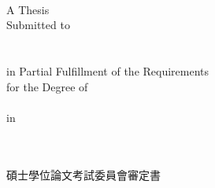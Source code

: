 \begin{center}
\fi
%
\renewcommand{\baselinestretch}{\mybaselinestretch}   %
\large %
%
\vfill
\makebox[4cm][s]{\large{\univCname}}\\%
\makebox[6cm][s]{\large{\deptCname}}\\%
\\%
%
\vfill
\large{A Thesis}\\%
\large{Submitted to }%
%
\large{\fulldeptEname}\\%
%
%
\ifx \collEname  \itsempty
\relax %
\else
\large{\collEname}\\%
\fi
%
\large{\univEname}\\%
%
\large{in Partial Fulfillment of the Requirements}\\
%
\large{for the Degree of}\\
%
\large{\degreeEname}\\%
%
\large{in}\\
%
\large{\deptEname}\\%
%
\large{\eMonth\ \eYear}\\%
%
\large{\ePlace}%
\vfill
{}
\end{center}
\normalsize
\clearpage
%
\newpage%
\thispagestyle{EmptyWaterMarkPage}  %
%

\begin{center}
\fontsize{24}{36}\selectfont 碩士學位論文考試委員會審定書\\
\vspace{0.5cm}
\end{center}

